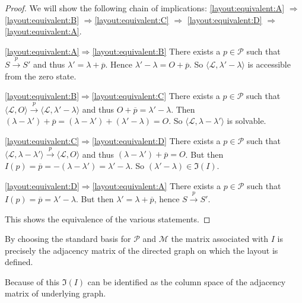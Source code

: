\begin{proof}
	We will show the following chain of implications: \ref{layout:equivalent:A}
	$\Rightarrow$ \ref{layout:equivalent:B} $\Rightarrow$\ref{layout:equivalent:C}
	$\Rightarrow$ \ref{layout:equivalent:D} $\Rightarrow$\ref{layout:equivalent:A}.
	\begin{namedlist}[\ref{layout:equivalent:D}$\Rightarrow$\ref{layout:equivalent:A}]
		\item[\ref{layout:equivalent:A}$\Rightarrow$\ref{layout:equivalent:B}] 
		There exists a $p\in\mathcal{P}$ such that $S \overset{p}{\rightarrow} S'$ 
		and thus $\lambda' = \lambda+\overline{p}$. Hence $\lambda'-\lambda = O + \overline{p}$. 
		So $\langle\mathcal{L},\lambda'-\lambda\rangle$ is accessible
		from the zero state.
		
		\item[\ref{layout:equivalent:B}$\Rightarrow$\ref{layout:equivalent:C}] 
		There exists a $p\in\mathcal{P}$ such that $\langle\mathcal{L},O\rangle
		\overset{p}{\rightarrow} \langle\mathcal{L},\lambda'-
		\lambda\rangle$ and thus $O+\overline{p} = \lambda'-\lambda$.
		Then $(\lambda-\lambda') + \overline{p} = (\lambda-\lambda') +
		(\lambda'-\lambda) = O.$ So $\langle\mathcal{L},\lambda-
		\lambda'\rangle$ is solvable.
		
		\item[\ref{layout:equivalent:C}$\Rightarrow$\ref{layout:equivalent:D}] 
		There exists a $p\in\mathcal{P}$ such that
		$\langle\mathcal{L},\lambda-\lambda'\rangle
		\overset{p}{\rightarrow} \langle\mathcal{L},O\rangle$ and thus
		$(\lambda-\lambda') + \overline{p} = O$. But then $I(p) =
		\overline{p} = - (\lambda-\lambda') = \lambda'-\lambda$. So
		$(\lambda'-\lambda)\in\Im(I)$.
		 
		\item[\ref{layout:equivalent:D}$\Rightarrow$\ref{layout:equivalent:A}]
		There exists a $p\in\mathcal{P}$ such that $I(p) = \overline{p} =
		\lambda'-\lambda$. But then $\lambda' = \lambda + \overline{p}$,
		hence $S \overset{p}{\rightarrow} S'$.
	\end{namedlist}
	
	This shows the equivalence of the various statements.
\end{proof}

\begin{remark}
	By choosing the standard basis for $\mathcal{P}$ and $\mathcal{M}$ the
	matrix associated with $I$ is precisely the adjacency matrix of the
	directed graph on which the layout is defined.
	
	Because of this $\Im(I)$ can be identified as the column space of the
	adjacency matrix of underlying graph.
\end{remark}

